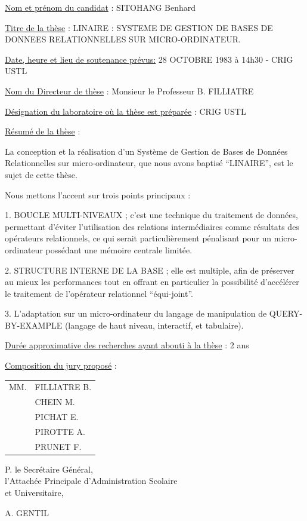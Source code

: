 \uline{Nom et prénom du candidat} : SITOHANG Benhard

\uline{Titre de la thèse} : LINAIRE : SYSTEME DE GESTION DE BASES DE DONNEES RELATIONNELLES SUR MICRO-ORDINATEUR.

\uline{Date, heure et lieu de soutenance prévus:} 28 OCTOBRE 1983 à 14h30 - CRIG USTL

\uline{Nom du Directeur de thèse} : Monsieur le Professeur B. FILLIATRE

\uline{Désignation du laboratoire où la thèse est préparée} : CRIG USTL

\uline{Résumé de la thèse} :

La conception et la réalisation d'un Système de Gestion de Bases de Données Relationnelles sur micro-ordinateur, que nous avons baptisé ``LINAIRE'', est le sujet de cette thèse.

Nous mettons l'accent sur trois points principaux :

1. BOUCLE MULTI-NIVEAUX ; c'est une technique du traitement de données, permettant d'éviter l'utilisation des relations intermédiaires comme résultats des opérateurs relationnels, ce qui serait particulièrement pénalisant pour un micro-ordinateur possédant une mémoire centrale limitée.

2. STRUCTURE INTERNE DE LA BASE ; elle est multiple, afin de préserver au mieux les performances tout en offrant en particulier la possibilité d'accélérer le traitement de l'opérateur relationnel ``équi-joint''.

3. L'adaptation sur un micro-ordinateur du langage de manipulation de QUERY-BY-EXAMPLE (langage de haut niveau, interactif, et tabulaire).

\uline{Durée approximative des recherches ayant abouti à la thèse} : 2 ans

\uline{Composition du jury proposé} :

\begin{tabular}{ll}
MM. & FILLIATRE B.\\
& CHEIN M.\\
& PICHAT E.\\
& PIROTTE A.\\
& PRUNET F.
\end{tabular}

\begin{center}
P. le Secrétaire Général,\\
l'Attachée Principale d'Administration Scolaire\\
et Universitaire,


A. GENTIL
\end{center}

